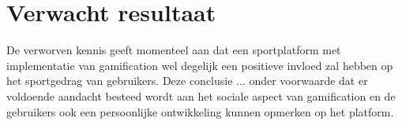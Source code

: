 

\section{Verwacht resultaat}%
\label{sec:verwachte_resultaten}

De verworven kennis geeft momenteel aan dat een sportplatform met implementatie van gamification wel degelijk een positieve invloed zal hebben op het sportgedrag van gebruikers. Deze conclusie ... onder voorwaarde dat er voldoende aandacht besteed wordt aan het sociale aspect van gamification en de gebruikers ook een persoonlijke ontwikkeling kunnen opmerken op het platform.





